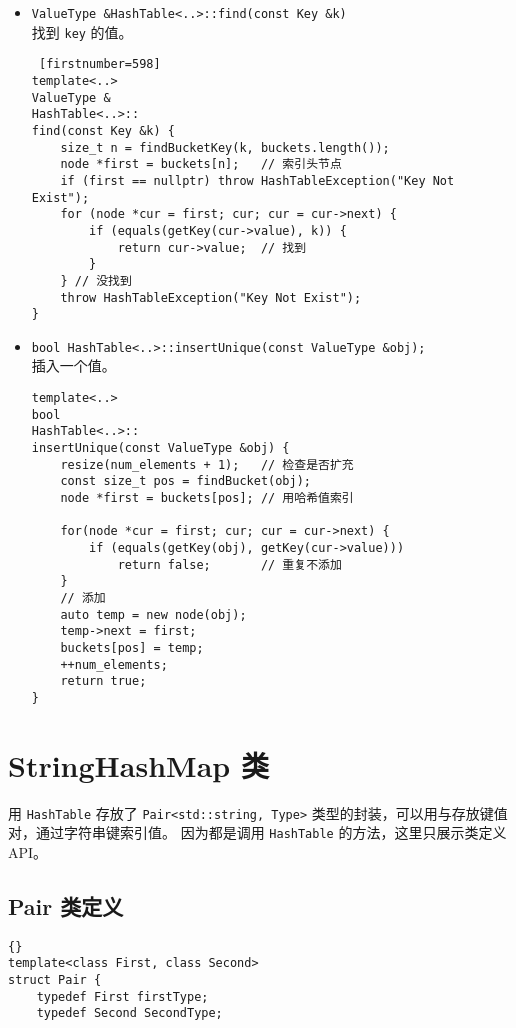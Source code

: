 {\begin{itemize}
      \item \lstinline{ValueType &HashTable<..>::find(const Key &k)}\\
            找到 \lstinline{key} 的值。
\begin{lstlisting} [firstnumber=598]
template<..>
ValueType &
HashTable<..>::
find(const Key &k) {
    size_t n = findBucketKey(k, buckets.length());
    node *first = buckets[n];   // 索引头节点
    if (first == nullptr) throw HashTableException("Key Not Exist");
    for (node *cur = first; cur; cur = cur->next) {
        if (equals(getKey(cur->value), k)) {
            return cur->value;  // 找到
        }
    } // 没找到
    throw HashTableException("Key Not Exist");
}\end{lstlisting}
      \item \lstinline{bool HashTable<..>::insertUnique(const ValueType &obj);} \\
            插入一个值。
\begin{lstlisting}[escapechar=^, firstnumber=561]
template<..>
bool
HashTable<..>::
insertUnique(const ValueType &obj) {
    resize(num_elements + 1);   // 检查是否扩充
    const size_t pos = findBucket(obj);
    node *first = buckets[pos]; // 用哈希值索引

    for(node *cur = first; cur; cur = cur->next) {
        if (equals(getKey(obj), getKey(cur->value)))
            return false;       // 重复不添加
    }
    // 添加
    auto temp = new node(obj);
    temp->next = first;
    buckets[pos] = temp;
    ++num_elements;
    return true;
}\end{lstlisting}
\end{itemize}


\section{StringHashMap 类}

用 \lstinline{HashTable} 存放了 \lstinline{Pair<std::string, Type>} 类型的封装，可以用与存放键值对，通过字符串键索引值。%
因为都是调用 \lstinline{HashTable} 的方法，这里只展示类定义 API。


\subsection{Pair 类定义}
\begin{lstlisting}[firstnumber=699, caption=Pair 类定义]{}
template<class First, class Second>
struct Pair {
    typedef First firstType;
    typedef Second SecondType;


\end{lstlisting}}
